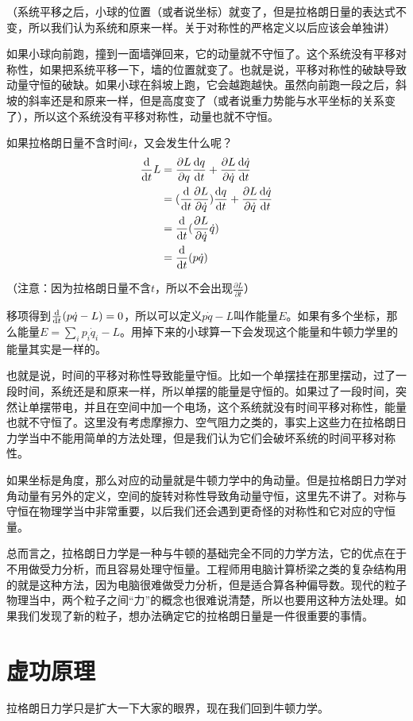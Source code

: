 （系统平移之后，小球的位置（或者说坐标）就变了，但是拉格朗日量的表达式不变，所以我们认为系统和原来一样。关于对称性的严格定义以后应该会单独讲）

如果小球向前跑，撞到一面墙弹回来，它的动量就不守恒了。这个系统没有平移对称性，如果把系统平移一下，墙的位置就变了。也就是说，平移对称性的破缺导致动量守恒的破缺。如果小球在斜坡上跑，它会越跑越快。虽然向前跑一段之后，斜坡的斜率还是和原来一样，但是高度变了（或者说重力势能与水平坐标的关系变了），所以这个系统没有平移对称性，动量也就不守恒。

如果拉格朗日量不含时间$t$，又会发生什么呢？
\begin{align*}
\opdt L&=\frac{\partial L}{\partial q} \frac{\opd q}{\opd t}+\frac{\partial L}{\partial \dot q} \frac{\opd \dot q}{\opd t} \\
&=(\opdt \frac{\partial L}{\partial \dot q}) \frac{\opd q}{\opd t}+\frac{\partial L}{\partial \dot q} \frac{\opd \dot q}{\opd t} \\
&=\opdt(\frac{\partial L}{\partial \dot q} \dot q) \\
&=\opdt(p \dot q)
\end{align*}

（注意：因为拉格朗日量不含$t$，所以不会出现$\frac{\partial L}{\partial t}$）

移项得到$\frac{\mathop{}\!\mathrm{d}}{\mathop{}\!\mathrm{d} t}(p \dot q-L)=0$，所以可以定义$p \dot q-L$叫作能量$E$。如果有多个坐标，那么能量$E=\sum_i p_i \dot q_i-L$。用掉下来的小球算一下会发现这个能量和牛顿力学里的能量其实是一样的。

也就是说，时间的平移对称性导致能量守恒。比如一个单摆挂在那里摆动，过了一段时间，系统还是和原来一样，所以单摆的能量是守恒的。如果过了一段时间，突然让单摆带电，并且在空间中加一个电场，这个系统就没有时间平移对称性，能量也就不守恒了。这里没有考虑摩擦力、空气阻力之类的，事实上这些力在拉格朗日力学当中不能用简单的方法处理，但是我们认为它们会破坏系统的时间平移对称性。

如果坐标是角度，那么对应的动量就是牛顿力学中的角动量。但是拉格朗日力学对角动量有另外的定义，空间的旋转对称性导致角动量守恒，这里先不讲了。对称与守恒在物理学当中非常重要，以后我们还会遇到更奇怪的对称性和它对应的守恒量。

总而言之，拉格朗日力学是一种与牛顿的基础完全不同的力学方法，它的优点在于不用做受力分析，而且容易处理守恒量。工程师用电脑计算桥梁之类的复杂结构用的就是这种方法，因为电脑很难做受力分析，但是适合算各种偏导数。现代的粒子物理当中，两个粒子之间“力”的概念也很难说清楚，所以也要用这种方法处理。如果我们发现了新的粒子，想办法确定它的拉格朗日量是一件很重要的事情。
\section{虚功原理}
拉格朗日力学只是扩大一下大家的眼界，现在我们回到牛顿力学。


